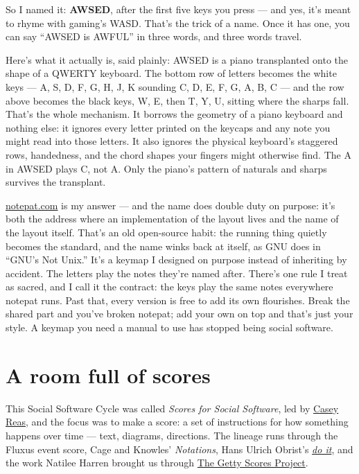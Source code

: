 \documentclass[11pt,letterpaper]{article}
\newcommand{\np}{notepat}
\begin{document}
So I named it: \textbf{AWSED}, after the first five keys you press --- and yes, it's meant to rhyme with gaming's WASD. That's the trick of a name. Once it has one, you can say ``AWSED is AWFUL'' in three words, and three words travel.

Here's what it actually is, said plainly: AWSED is a piano transplanted onto the shape of a QWERTY keyboard. The bottom row of letters becomes the white keys --- A, S, D, F, G, H, J, K sounding C, D, E, F, G, A, B, C --- and the row above becomes the black keys, W, E, then T, Y, U, sitting where the sharps fall. That's the whole mechanism. It borrows the geometry of a piano keyboard and nothing else: it ignores every letter printed on the keycaps and any note you might read into those letters. It also ignores the physical keyboard's staggered rows, handedness, and the chord shapes your fingers might otherwise find. The A in AWSED plays C, not A. Only the piano's pattern of naturals and sharps survives the transplant.

\href{https://notepat.com}{notepat.com} is my answer --- and the name does double duty on purpose: it's both the address where an implementation of the layout lives and the name of the layout itself. That's an old open-source habit: the running thing quietly becomes the standard, and the name winks back at itself, as GNU does in ``GNU's Not Unix.'' It's a keymap I designed on purpose instead of inheriting by accident. The letters play the notes they're named after. There's one rule I treat as sacred, and I call it the contract: the keys play the same notes everywhere \np{} runs. Past that, every version is free to add its own flourishes. Break the shared part and you've broken \np{}; add your own on top and that's just your style. A keymap you need a manual to use has stopped being social software.

\section{A room full of scores}

This Social Software Cycle was called \textit{Scores for Social Software}, led by \href{https://reas.com}{Casey Reas}, and the focus was to make a score: a set of instructions for how something happens over time --- text, diagrams, directions. The lineage runs through the Fluxus event score, Cage and Knowles' \textit{Notations}, Hans Ulrich Obrist's \href{https://curatorsintl.org/special-projects/do-it}{\textit{do it}}, and the work Natilee Harren brought us through \href{https://www.getty.edu/publications/scores/}{The Getty Scores Project}.
\end{document}
